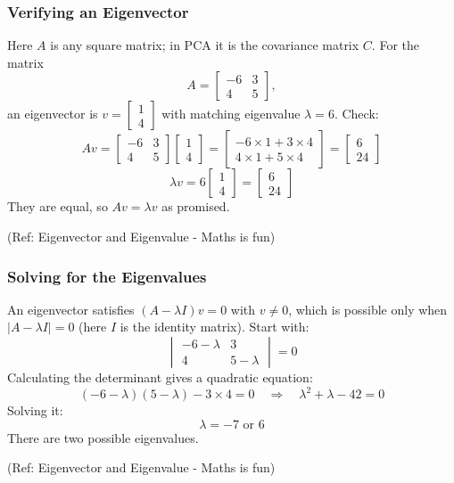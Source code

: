 \begin{frame}[fragile]\frametitle{Verifying an Eigenvector}
Here $A$ is any square matrix; in PCA it is the covariance matrix $C$. For the matrix
\[
A = \begin{bmatrix} -6 & 3 \\ 4 & 5 \end{bmatrix},
\]
an eigenvector is $v = \begin{bmatrix} 1 \\ 4 \end{bmatrix}$ with matching eigenvalue $\lambda = 6$. Check:
\[
Av =
\begin{bmatrix} -6 & 3 \\ 4 & 5 \end{bmatrix}
\begin{bmatrix} 1 \\ 4 \end{bmatrix}
=
\begin{bmatrix} -6 \times 1 + 3 \times 4 \\ 4 \times 1 + 5 \times 4 \end{bmatrix}
=
\begin{bmatrix} 6 \\ 24 \end{bmatrix}
\]
\[
\lambda v = 6
\begin{bmatrix} 1 \\ 4 \end{bmatrix}
=
\begin{bmatrix} 6 \\ 24 \end{bmatrix}
\]
They are equal, so $Av = \lambda v$ as promised.

{\tiny (Ref: Eigenvector and Eigenvalue - Maths is fun)}
\end{frame}

\begin{frame}[fragile]\frametitle{Solving for the Eigenvalues}
An eigenvector satisfies $(A - \lambda I)v = 0$ with $v \neq 0$, which is possible only when $|A - \lambda I| = 0$ (here $I$ is the identity matrix). Start with:
\[
\begin{vmatrix} -6-\lambda & 3 \\ 4 & 5-\lambda \end{vmatrix} = 0
\]
Calculating the determinant gives a quadratic equation:
\[
(-6-\lambda)(5-\lambda) - 3 \times 4 = 0
\quad\Rightarrow\quad
\lambda^2 + \lambda - 42 = 0
\]
Solving it:
\[
\lambda = -7 \text{ or } 6
\]
There are two possible eigenvalues.

{\tiny (Ref: Eigenvector and Eigenvalue - Maths is fun)}
\end{frame}

